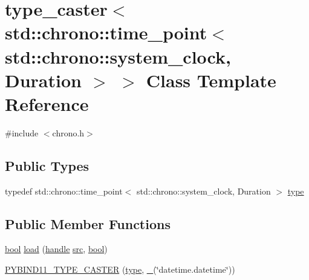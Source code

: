 \hypertarget{classtype__caster_3_01std_1_1chrono_1_1time__point_3_01std_1_1chrono_1_1system__clock_00_01_duration_01_4_01_4}{}\section{type\+\_\+caster$<$ std\+::chrono\+::time\+\_\+point$<$ std\+::chrono\+::system\+\_\+clock, Duration $>$ $>$ Class Template Reference}
\label{classtype__caster_3_01std_1_1chrono_1_1time__point_3_01std_1_1chrono_1_1system__clock_00_01_duration_01_4_01_4}


{\ttfamily \#include $<$chrono.\+h$>$}

\subsection*{Public Types}
\begin{DoxyCompactItemize}
\item 
typedef std\+::chrono\+::time\+\_\+point$<$ std\+::chrono\+::system\+\_\+clock, Duration $>$ \mbox{\hyperlink{classtype__caster_3_01std_1_1chrono_1_1time__point_3_01std_1_1chrono_1_1system__clock_00_01_duration_01_4_01_4_aa6ea8713f4efcca306c1ceb74a2877c7}{type}}
\end{DoxyCompactItemize}
\subsection*{Public Member Functions}
\begin{DoxyCompactItemize}
\item 
\mbox{\hyperlink{asdl_8h_af6a258d8f3ee5206d682d799316314b1}{bool}} \mbox{\hyperlink{classtype__caster_3_01std_1_1chrono_1_1time__point_3_01std_1_1chrono_1_1system__clock_00_01_duration_01_4_01_4_a81319bc9d5f326aadb99d284efc1ba07}{load}} (\mbox{\hyperlink{classhandle}{handle}} \mbox{\hyperlink{_s_d_l__opengl__glext_8h_a72e0fdf0f845ded60b1fada9e9195cd7}{src}}, \mbox{\hyperlink{asdl_8h_af6a258d8f3ee5206d682d799316314b1}{bool}})
\item 
\mbox{\hyperlink{classtype__caster_3_01std_1_1chrono_1_1time__point_3_01std_1_1chrono_1_1system__clock_00_01_duration_01_4_01_4_a2b40fcaf6bd75f557fbe809980edbaa8}{P\+Y\+B\+I\+N\+D11\+\_\+\+T\+Y\+P\+E\+\_\+\+C\+A\+S\+T\+ER}} (\mbox{\hyperlink{classtype__caster_3_01std_1_1chrono_1_1time__point_3_01std_1_1chrono_1_1system__clock_00_01_duration_01_4_01_4_aa6ea8713f4efcca306c1ceb74a2877c7}{type}}, \mbox{\hyperlink{descr_8h_af114703e20c6527e87163eb2798f74b8}{\+\_\+}}(\char`\"{}datetime.\+datetime\char`\"{}))
\end{DoxyCompactItemize}
